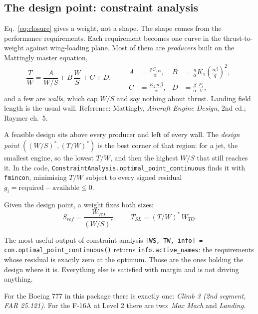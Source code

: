 \documentclass[11pt, a4paper]{article}
\begin{document}
\subsection{The design point: constraint analysis}

Eq.~\ref{eq:closure} gives a weight, not a shape. The shape comes from the
performance requirements. Each requirement becomes one curve in the
thrust-to-weight against wing-loading plane. Most of them are \emph{producers}
built on the Mattingly master equation,
\begin{equation}
\frac{T}{W} = \frac{A}{W/S} + B\,\frac{W}{S} + C + D,
\qquad
\begin{aligned}
A &= \frac{q\,C_{D0}}{\alpha}, &
B &= \frac{q}{\alpha}K_1\!\left(\frac{n\beta}{q}\right)^{\!2},\\
C &= \frac{K_2\,n\,\beta}{\alpha}, &
D &= \frac{\beta}{\alpha}\,\frac{P_s}{V},
\end{aligned}
\label{eq:master}
\end{equation}
and a few are \emph{walls}, which cap $W/S$ and say nothing about thrust.
Landing field length is the usual wall. Reference: Mattingly,
\emph{Aircraft Engine Design}, 2nd ed.; Raymer ch.~5.

A feasible design sits above every producer and left of every wall. The
\emph{design point} $\left((W/S)^*, (T/W)^*\right)$ is the best corner of that
region: for a jet, the smallest engine, so the lowest $T/W$, and then the
highest $W/S$ that still reaches it. In the code,
\texttt{ConstraintAnalysis.optimal\_point\_continuous} finds it with
\texttt{fmincon}, minimising $T/W$ subject to every signed residual
$g_i = \text{required} - \text{available} \le 0$.

Given the design point, a weight fixes both sizes:
\begin{equation}
S_{ref} = \frac{W_{TO}}{(W/S)^*}, \qquad T_{SL} = (T/W)^* \, W_{TO}.
\label{eq:slaved}
\end{equation}

\begin{keybox}{The most useful output of constraint analysis}
\texttt{[WS, TW, info] = con.optimal\_point\_continuous()} returns
\texttt{info.active\_names}: the requirements whose residual is exactly zero at
the optimum. Those are the ones holding the design where it is. Everything else
is satisfied with margin and is not driving anything.

For the Boeing 777 in this package there is exactly one:
\emph{Climb 3 (2nd segment, FAR 25.121)}. For the F-16A at Level 2 there are
two: \emph{Max Mach} and \emph{Landing}.
\end{keybox}
\end{document}
